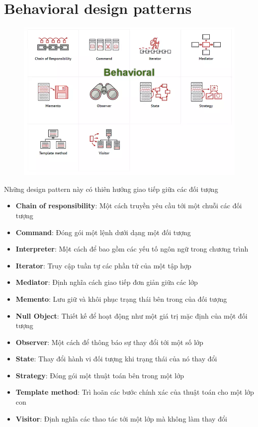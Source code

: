 \section{Behavioral design patterns}
\begin{figure}[!htb]
    \centering
    \includegraphics[width=\textwidth]{fig/Introduction/behavioral.png}
\end{figure}
Những design pattern này có thiên hướng giao tiếp giữa các đối tượng
\begin{itemize}
    \item \textbf{Chain of responsibility}: Một cách truyền yêu cầu tới một chuỗi các đối tượng
    \item \textbf{Command}: Đóng gói một lệnh dưới dạng một đối tượng
    \item \textbf{Interpreter}: Một cách để bao gồm các yếu tố ngôn ngữ trong chương trình
    \item \textbf{Iterator}: Truy cập tuần tự các phần tử của một tập hợp
    \item \textbf{Mediator}: Định nghĩa cách giao tiếp đơn giản giữa các lớp
    \item \textbf{Memento}: Lưu giữ và khôi phục trạng thái bên trong của đối tượng
    \item \textbf{Null Object}: Thiết kế để hoạt động như một giá trị mặc định của một đối tượng
    \item \textbf{Observer}: Một cách để thông báo sự thay đổi tới một số lớp
    \item \textbf{State}: Thay đổi hành vi đối tượng khi trạng thái của nó thay đổi
    \item \textbf{Strategy}: Đóng gói một thuật toán bên trong một lớp
    \item \textbf{Template method}: Trì hoãn các bước chính xác của thuật toán cho một lớp con
    \item \textbf{Visitor}: Định nghĩa các thao tác tới một lớp mà không làm thay đổi
\end{itemize}


\newpage


